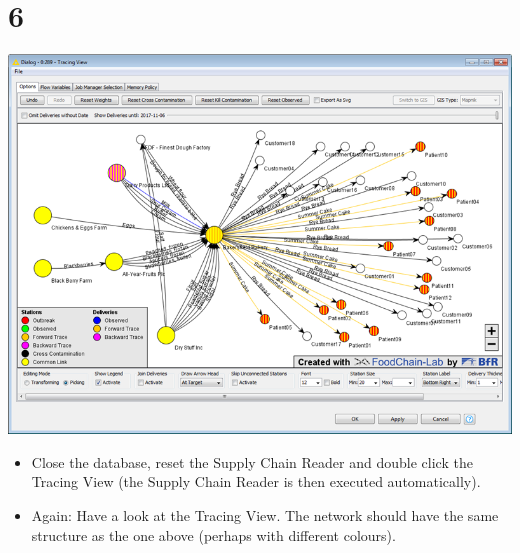 \documentclass[10pt]{beamer}
\begin{document}
\section{6}
\begin{frame}
	\begin{center}
			\includegraphics[height=0.6\textheight]{6.png}
	\end{center}
	\begin{itemize}
		\item Close the database, reset the Supply Chain Reader and double click the Tracing View (the Supply Chain Reader is then executed automatically).
		\item Again: Have a look at the Tracing View. The network should have the same structure as the one above (perhaps with different colours).
	\end{itemize}
\end{frame}
\end{document}
